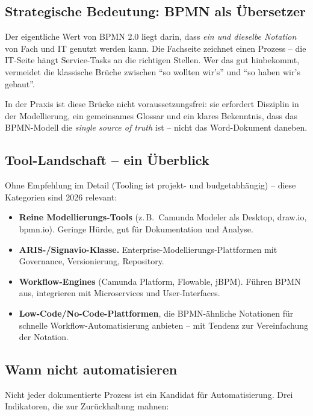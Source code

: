 \documentclass[11pt,a4paper,oneside]{article}
\begin{document}
\subsection{Strategische Bedeutung: BPMN als Übersetzer}

Der eigentliche Wert von BPMN 2.0 liegt darin, dass \emph{ein und dieselbe Notation} von Fach und IT genutzt werden kann. Die Fachseite zeichnet einen Prozess -- die IT-Seite hängt Service-Tasks an die richtigen Stellen. Wer das gut hinbekommt, vermeidet die klassische Brüche zwischen ``so wollten wir's'' und ``so haben wir's gebaut''.

In der Praxis ist diese Brücke nicht voraussetzungsfrei: sie erfordert Disziplin in der Modellierung, ein gemeinsames Glossar und ein klares Bekenntnis, dass das BPMN-Modell die \emph{single source of truth} ist -- nicht das Word-Dokument daneben.

\subsection{Tool-Landschaft -- ein Überblick}

Ohne Empfehlung im Detail (Tooling ist projekt- und budgetabhängig) -- diese Kategorien sind 2026 relevant:

\begin{itemize}
  \item \textbf{Reine Modellierungs-Tools} (z.\,B.\ Camunda Modeler als Desktop, draw.io, bpmn.io). Geringe Hürde, gut für Dokumentation und Analyse.
  \item \textbf{ARIS-/Signavio-Klasse.} Enterprise-Modellierungs-Plattformen mit Governance, Versionierung, Repository.
  \item \textbf{Workflow-Engines} (Camunda Platform, Flowable, jBPM). Führen BPMN aus, integrieren mit Microservices und User-Interfaces.
  \item \textbf{Low-Code/No-Code-Plattformen}, die BPMN-ähnliche Notationen für schnelle Workflow-Automatisierung anbieten -- mit Tendenz zur Vereinfachung der Notation.
\end{itemize}

\subsection{Wann nicht automatisieren}

Nicht jeder dokumentierte Prozess ist ein Kandidat für Automatisierung. Drei Indikatoren, die zur Zurückhaltung mahnen:
\end{document}

